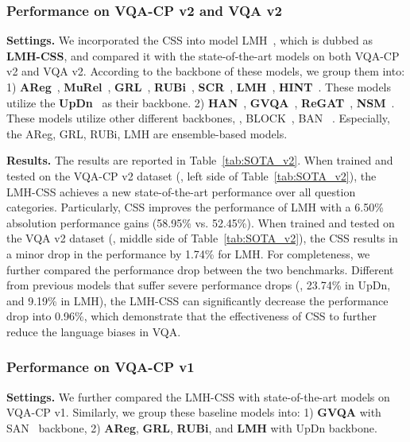 \documentclass[10pt,twocolumn,letterpaper]{article}
\begin{document}
\subsubsection{Performance on VQA-CP v2 and VQA v2}
\noindent\textbf{Settings.} We incorporated the CSS into model LMH~\cite{clark2019don}, which is dubbed as \textbf{LMH-CSS}, and compared it with the state-of-the-art models on both VQA-CP v2 and VQA v2. According to the backbone of these models, we group them into: 1) \textbf{AReg}~\cite{ramakrishnan2018overcoming}, \textbf{MuRel}~\cite{cadene2019murel}, \textbf{GRL}~\cite{grand2019adversarial}, \textbf{RUBi}~\cite{cadene2019rubi}, \textbf{SCR}~\cite{wu2019self}, \textbf{LMH}~\cite{clark2019don}, \textbf{HINT}~\cite{selvaraju2019taking}. These models utilize the \textbf{UpDn}~\cite{anderson2018bottom} as their backbone. 2) \textbf{HAN}~\cite{malinowski2018learning}, \textbf{GVQA}~\cite{agrawal2018don}, 
\textbf{ReGAT}~\cite{li2019relation}, \textbf{NSM}~\cite{hudson2019learning}. These models utilize other different backbones, \eg, BLOCK~\cite{ben2019block}, BAN~\cite{kim2018bilinear} \etc. Especially, the AReg, GRL, RUBi, LMH are ensemble-based models.

\noindent\textbf{Results.} The results are reported in Table~\ref{tab:SOTA_v2}. When trained and tested on the VQA-CP v2 dataset (\ie, left side of Table~\ref{tab:SOTA_v2}), the LMH-CSS achieves a new state-of-the-art performance over all question categories. Particularly, CSS improves the performance of LMH with a 6.50\% absolution performance gains (58.95\% vs. 52.45\%). When trained and tested on the VQA v2 dataset (\ie, middle side of Table~\ref{tab:SOTA_v2}), the CSS results in a minor drop in the performance by 1.74\% for LMH. For completeness, we further compared the performance drop between the two benchmarks. Different from previous models that suffer severe performance drops (\eg, 23.74\% in UpDn, and 9.19\% in LMH), the LMH-CSS can significantly decrease the performance drop into 0.96\%, which demonstrate that the effectiveness of CSS to further reduce the language biases in VQA.

\subsubsection{Performance on VQA-CP v1}

\noindent\textbf{Settings.} We further compared the LMH-CSS with state-of-the-art models on VQA-CP v1. Similarly, we group these baseline models into: 1) \textbf{GVQA} with SAN~\cite{yang2016stacked} backbone, 2) \textbf{AReg}, \textbf{GRL}, \textbf{RUBi}, and \textbf{LMH} with UpDn backbone.
\end{document}
